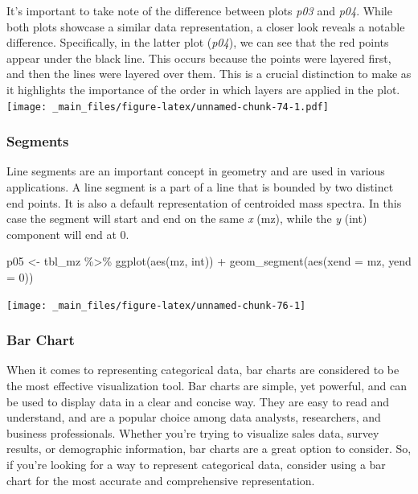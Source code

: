 \documentclass[
]{book}
\newenvironment{Shaded}{\begin{snugshade}}{\end{snugshade}}
\newcommand{\AttributeTok}[1]{\textcolor[rgb]{0.77,0.63,0.00}{#1}}
\newcommand{\DecValTok}[1]{\textcolor[rgb]{0.00,0.00,0.81}{#1}}
\newcommand{\FunctionTok}[1]{\textcolor[rgb]{0.00,0.00,0.00}{#1}}
\newcommand{\NormalTok}[1]{#1}
\newcommand{\OtherTok}[1]{\textcolor[rgb]{0.56,0.35,0.01}{#1}}
\newcommand{\SpecialCharTok}[1]{\textcolor[rgb]{0.00,0.00,0.00}{#1}}
\begin{document}
It's important to take note of the difference between plots \emph{p03} and \emph{p04}. While both plots showcase a similar data representation, a closer look reveals a notable difference. Specifically, in the latter plot (\emph{p04}), we can see that the red points appear under the black line. This occurs because the points were layered first, and then the lines were layered over them. This is a crucial distinction to make as it highlights the importance of the order in which layers are applied in the plot.
\texttt{[image: \_main\_files/figure-latex/unnamed-chunk-74-1.pdf]}

\hypertarget{segments}{%
\subsubsection*{Segments}\label{segments}}

Line segments are an important concept in geometry and are used in various applications. A line segment is a part of a line that is bounded by two distinct end points. It is also a default representation of centroided mass spectra. In this case the segment will start and end on the same \emph{x} (mz), while the \emph{y} (int) component will end at 0.

\begin{Shaded}
\begin{Highlighting}[]
\NormalTok{p05 }\OtherTok{\textless{}{-}}\NormalTok{ tbl\_mz }\SpecialCharTok{\%\textgreater{}\%} \FunctionTok{ggplot}\NormalTok{(}\FunctionTok{aes}\NormalTok{(mz, int)) }\SpecialCharTok{+} \FunctionTok{geom\_segment}\NormalTok{(}\FunctionTok{aes}\NormalTok{(}\AttributeTok{xend =}\NormalTok{ mz, }\AttributeTok{yend =} \DecValTok{0}\NormalTok{))}
\end{Highlighting}
\end{Shaded}

\begin{center}\texttt{[image: \_main\_files/figure-latex/unnamed-chunk-76-1]} \end{center}

\hypertarget{bar-chart}{%
\subsubsection*{Bar Chart}\label{bar-chart}}

When it comes to representing categorical data, bar charts are considered to be the most effective visualization tool. Bar charts are simple, yet powerful, and can be used to display data in a clear and concise way. They are easy to read and understand, and are a popular choice among data analysts, researchers, and business professionals. Whether you're trying to visualize sales data, survey results, or demographic information, bar charts are a great option to consider. So, if you're looking for a way to represent categorical data, consider using a bar chart for the most accurate and comprehensive representation.
\end{document}
